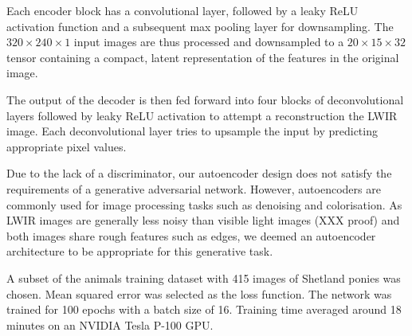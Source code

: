 \documentclass{l4proj}
\begin{document}
Each encoder block has a convolutional layer, followed by a leaky ReLU activation function and a subsequent max pooling layer for downsampling. The $320 \times 240 \times 1$ input images are thus processed and downsampled to a $20 \times 15 \times 32$ tensor containing a compact, latent representation of the features in the original image.

The output of the decoder is then fed forward into four blocks of deconvolutional layers followed by leaky ReLU activation to attempt a reconstruction the LWIR image. Each deconvolutional layer tries to upsample the input by predicting appropriate pixel values.

Due to the lack of a discriminator, our autoencoder design does not satisfy the requirements of a generative adversarial network. However, autoencoders are commonly used for image processing tasks such as denoising and colorisation. As LWIR images are generally less noisy than visible light images (XXX proof) and both images share rough features such as edges, we deemed an autoencoder architecture to be appropriate for this generative task.

A subset of the animals training dataset with 415 images of Shetland ponies was chosen. Mean squared error was selected as the loss function. The network was trained for 100 epochs with a batch size of 16. Training time averaged around 18 minutes on an NVIDIA Tesla P-100 GPU.
\end{document}
